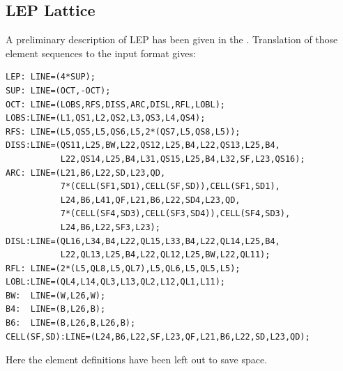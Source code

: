 \subsection{LEP Lattice}
\label{sec:lep}
A preliminary description of LEP has been given in the
.
Translation of those element sequences to the \opal input format gives:
\begin{verbatim}
LEP: LINE=(4*SUP);
SUP: LINE=(OCT,-OCT);
OCT: LINE=(LOBS,RFS,DISS,ARC,DISL,RFL,LOBL);
LOBS:LINE=(L1,QS1,L2,QS2,L3,QS3,L4,QS4);
RFS: LINE=(L5,QS5,L5,QS6,L5,2*(QS7,L5,QS8,L5));
DISS:LINE=(QS11,L25,BW,L22,QS12,L25,B4,L22,QS13,L25,B4,
           L22,QS14,L25,B4,L31,QS15,L25,B4,L32,SF,L23,QS16);
ARC: LINE=(L21,B6,L22,SD,L23,QD,
           7*(CELL(SF1,SD1),CELL(SF,SD)),CELL(SF1,SD1),
           L24,B6,L41,QF,L21,B6,L22,SD4,L23,QD,
           7*(CELL(SF4,SD3),CELL(SF3,SD4)),CELL(SF4,SD3),
           L24,B6,L22,SF3,L23);
DISL:LINE=(QL16,L34,B4,L22,QL15,L33,B4,L22,QL14,L25,B4,
           L22,QL13,L25,B4,L22,QL12,L25,BW,L22,QL11);
RFL: LINE=(2*(L5,QL8,L5,QL7),L5,QL6,L5,QL5,L5);
LOBL:LINE=(QL4,L14,QL3,L13,QL2,L12,QL1,L11);
BW:  LINE=(W,L26,W);
B4:  LINE=(B,L26,B);
B6:  LINE=(B,L26,B,L26,B);
CELL(SF,SD):LINE=(L24,B6,L22,SF,L23,QF,L21,B6,L22,SD,L23,QD);
\end{verbatim}
Here the element definitions have been left out to save space.
